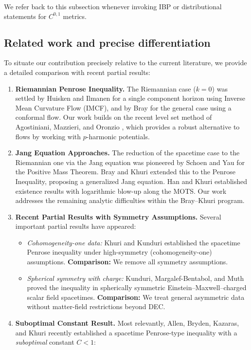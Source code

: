 We refer back to this subsection whenever invoking IBP or distributional statements for $C^{0,1}$ metrics.

\subsection{Related work and precise differentiation}\label{sec:RelatedWork}
To situate our contribution precisely relative to the current literature, we provide a detailed comparison with recent partial results:
\begin{enumerate}[(RW1)]
    \item \textbf{Riemannian Penrose Inequality.} The Riemannian case ($k=0$) was settled by Huisken and Ilmanen \cite{huisken2001} for a single component horizon using Inverse Mean Curvature Flow (IMCF), and by Bray \cite{bray2001} for the general case using a conformal flow. Our work builds on the recent level set method of Agostiniani, Mazzieri, and Oronzio \cite{amo2024}, which provides a robust alternative to flows by working with $p$-harmonic potentials.
    \item \textbf{Jang Equation Approaches.} The reduction of the spacetime case to the Riemannian one via the Jang equation was pioneered by Schoen and Yau \cite{schoenyau1981} for the Positive Mass Theorem. Bray and Khuri \cite{braykhuri2010} extended this to the Penrose Inequality, proposing a generalized Jang equation. Han and Khuri \cite{hankhuri2013} established existence results with logarithmic blow-up along the MOTS. Our work addresses the remaining analytic difficulties within the Bray--Khuri program.
    \item \textbf{Recent Partial Results with Symmetry Assumptions.} Several important partial results have appeared:
    \begin{itemize}
        \item \emph{Cohomogeneity-one data:} Khuri and Kunduri \cite{khurikunduri2024} established the spacetime Penrose inequality under high-symmetry (cohomogeneity-one) assumptions. \textbf{Comparison:} We remove all symmetry assumptions.
        \item \emph{Spherical symmetry with charge:} Kunduri, Margalef-Bentabol, and Muth \cite{kundurimargalefmuth2023} proved the inequality in spherically symmetric Einstein--Maxwell--charged scalar field spacetimes. \textbf{Comparison:} We treat general asymmetric data without matter-field restrictions beyond DEC.
    \end{itemize}
    \item \textbf{Suboptimal Constant Result.} Most relevantly, Allen, Bryden, Kazaras, and Khuri \cite{allenbrydenkazaraskhuri2025} recently established a spacetime Penrose-type inequality with a \emph{suboptimal} constant $C < 1$:

\end{enumerate}
